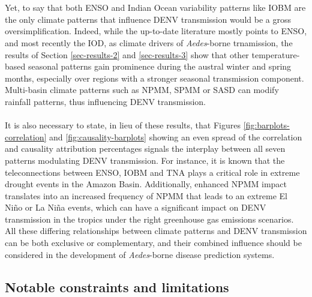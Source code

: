 \documentclass[10pt,twocolumn]{wlscirep}
\begin{document}
\\
\\
Yet, to say that both ENSO and Indian Ocean variability patterns like IOBM are the only climate patterns that influence DENV transmission would be a gross oversimplification. Indeed, while the up-to-date literature mostly points to ENSO, and most recently the IOD, as climate drivers of \textit{Aedes}-borne trnamission, the results of Section \ref{sec-results-2} and \ref{sec-results-3} show that other temperature-based seasonal patterns gain prominence during the austral winter and spring months, especially over regions with a stronger seasonal transmission component. Multi-basin climate patterns such as NPMM, SPMM or SASD can modify rainfall patterns, thus influencing DENV transmission.
\\
\\
It is also necessary to state, in lieu of these results, that Figures \ref{fig:barplots-correlation} and \ref{fig:causality-barplots} showing an even spread of the correlation and causality attribution percentages signals the interplay between all seven patterns modulating DENV transmission. For instance, it is known that the teleconnections between ENSO, IOBM and TNA plays a critical role in extreme drought events in the Amazon Basin\cite{mamani_2025}. Additionally, enhanced NPMM impact translates into an increased frequency of NPMM that leads to an extreme El Niño or La Niña events, which can have a significant impact on DENV transmission in the tropics under the right greenhouse gas emissions scenarios\cite{jia_2021}. All these differing relationships between climate patterns and DENV transmission can be both exclusive or complementary, and their combined influence should be considered in the development of \textit{Aedes}-borne disease prediction systems.

\subsection{Notable constraints and limitations} \label{sec-discussion-limitations}
\end{document}
